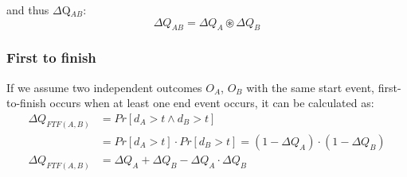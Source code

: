             and thus $\Delta$Q$_{AB}$:
        \begin{equation}
            \Delta Q_{AB} = \Delta Q_A \circledast \Delta Q_B
            \label{eq:}
        \end{equation}
        
    \subsubsection{First to finish}
            If we assume two independent outcomes $O_A$, $O_B$ with the same start event, first-to-finish occurs when at least one end event occurs, it can be calculated as:
        \begin{equation}
            \begin{split}
                \Delta Q_{FTF(A, B)} &= Pr[d_A > t \wedge d_B > t] \\
                & = Pr[d_A > t] \cdot Pr[d_B > t] = (1 - \Delta Q_A) \cdot (1 - \Delta Q_B) \\
                \Delta Q_{FTF(A, B)} &= \Delta Q_A + \Delta Q_B - \Delta Q_A \cdot \Delta Q_B  
            \end{split}    
            \label{eq:ftf} 
        \end{equation}

